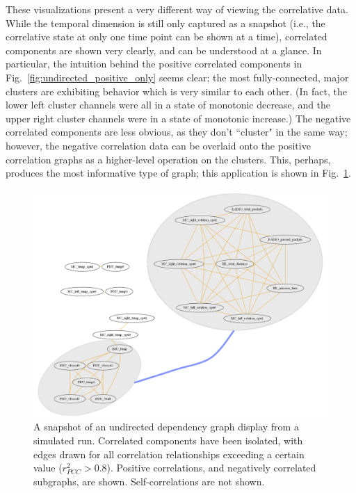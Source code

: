 These visualizations present a very different way of viewing the correlative data. While the temporal dimension is still only captured as a snapshot (i.e., the correlative state at only one time point can be shown at a time), correlated components are shown very clearly, and can be understood at a glance. In particular, the intuition behind the positive correlated components in Fig.~\ref{fig:undirected_positive_only} seems clear; the most fully-connected, major clusters are exhibiting behavior which is very similar to each other. (In fact, the lower left cluster channels were all in a state of monotonic decrease, and the upper right cluster channels were in a state of monotonic increase.) The negative correlated components are less obvious, as they don't ``cluster" in the same way; however, the negative correlation data can be overlaid onto the positive correlation graphs as a higher-level operation on the clusters. This, perhaps, produces the most informative type of graph; this application is shown in Fig.~\ref{fig:undirected_positive_with_negative_clusters}.

\begin{figure}[h]
\centering
    \includegraphics[width=\columnwidth]{images/undirected_positive_with_negative_clusters.png}
    \caption{A snapshot of an undirected dependency graph display from a simulated run. Correlated components have been isolated, with edges drawn for all correlation relationships exceeding a certain value ($r_{PCC}^{2} > 0.8$). Positive correlations, and negatively correlated subgraphs, are shown. Self-correlations are not shown.}
    \label{fig:undirected_positive_with_negative_clusters}
\end{figure}

